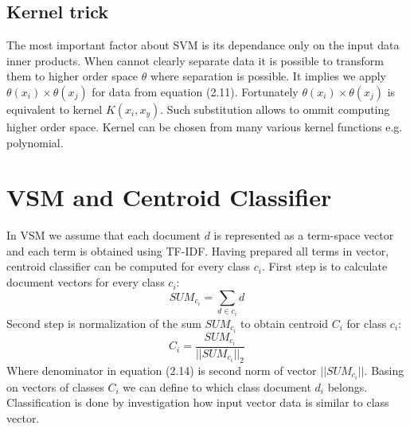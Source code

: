 \subsection{Kernel trick}
The most important factor about SVM is its dependance only on the input data inner products.\cite{6} When cannot clearly separate data it is possible to transform them to higher order space $\theta$ where separation is possible. It implies we apply $\theta(x_i) \times \theta(x_j)$ for data from equation (2.11). Fortunately $\theta(x_i) \times \theta(x_j)$ is equivalent to kernel $K(x_i,x_y)$. Such substitution allows to ommit computing higher order space. Kernel can be chosen from many various kernel functions e.g. polynomial. \cite{svm_wiki}

\section{VSM and Centroid Classifier}
In VSM we assume that each document $d$ is represented as a term-space vector and each term is obtained using TF-IDF. Having prepared all terms in vector, centroid classifier can be computed for every class $c_i$\cite{8}.
\newline First step is to calculate document vectors for every class $c_i$:
\begin{equation}
SUM_{c_i} = \sum_{d\in c_i}d
\end{equation}
\newline Second step is normalization of the sum $SUM_{c_i}$ to obtain centroid $C_i$ for class $c_i$:
\begin{equation}
C_i = \frac{SUM_{c_i}}{||SUM_{c_i}||_2}
\end{equation}
Where denominator in equation (2.14) is second norm of vector $||SUM_{c_i}||$. Basing on vectors of classes $C_i$ we can define to which class document $d_i$ belongs. Classification is done by investigation how input vector data is similar to class vector. 




